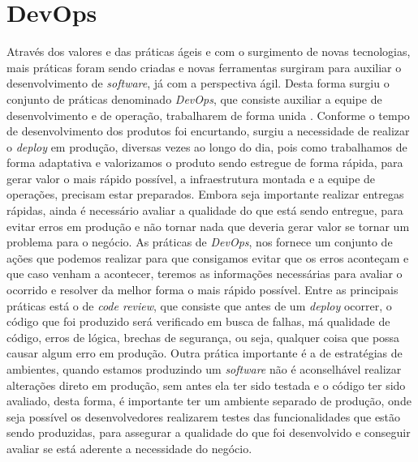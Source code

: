     \chapter{DevOps}
      Através dos valores e das práticas ágeis e com o surgimento de novas
      tecnologias, mais práticas foram sendo criadas e novas ferramentas surgiram
      para auxiliar o desenvolvimento de \textit{software}, já com a perspectiva
      ágil. Desta forma surgiu o conjunto de práticas denominado \textit{DevOps},
      que consiste auxiliar a equipe de desenvolvimento e de operação, trabalharem de
      forma unida \cite{TheDevOpsHandbook}. Conforme o tempo de desenvolvimento
      dos produtos foi encurtando, surgiu a necessidade de realizar o \textit{deploy}
      em produção, diversas vezes ao longo do dia, pois como trabalhamos de forma
      adaptativa e valorizamos o produto sendo estregue de forma rápida, para gerar
      valor o mais rápido possível, a infraestrutura montada e a equipe de operações,
      precisam estar preparados. Embora seja importante realizar entregas rápidas,
      ainda é necessário avaliar a qualidade do que está sendo entregue, para
      evitar erros em produção e não tornar nada que deveria gerar valor se
      tornar um problema para o negócio. \newline
      As práticas de \textit{DevOps}, nos fornece um conjunto de ações que podemos
      realizar para que consigamos evitar que os erros aconteçam e que caso venham
      a acontecer, teremos as informações necessárias para avaliar o ocorrido e
      resolver da melhor forma o mais rápido possível. \newline
      Entre as principais práticas está o de \textit{code review}, que consiste
      que antes de um \textit{deploy} ocorrer, o código que foi produzido será
      verificado em busca de falhas, má qualidade de código, erros de lógica,
      brechas de segurança, ou seja, qualquer coisa que possa causar algum erro
      em produção. Outra prática importante é a de estratégias de ambientes,
      quando estamos produzindo um \textit{software} não é aconselhável realizar
      alterações direto em produção, sem antes ela ter sido testada e o código
      ter sido avaliado, desta forma, é importante ter um ambiente separado de
      produção, onde seja possível os desenvolvedores realizarem testes das
      funcionalidades que estão sendo produzidas, para assegurar a qualidade do
      que foi desenvolvido e conseguir avaliar se está aderente a necessidade do
      negócio. \newline

